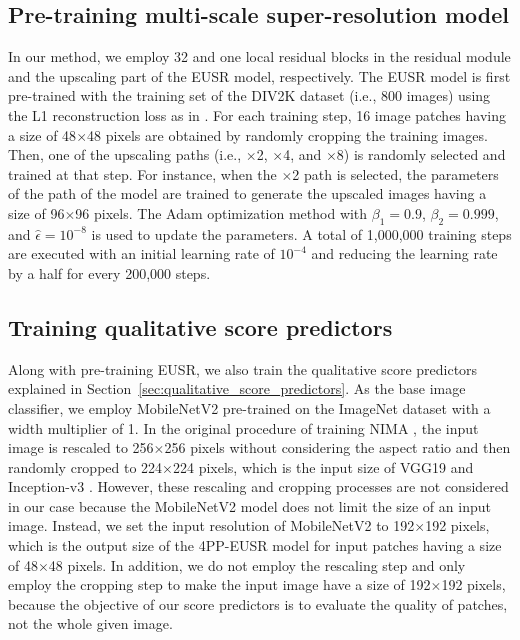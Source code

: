 \documentclass[runningheads]{llncs}
\begin{document}
\subsection{Pre-training multi-scale super-resolution model}
\label{sec:pretraining_eusr}

In our method, we employ 32 and one local residual blocks in the residual module and the upscaling part of the EUSR model, respectively.
The EUSR model is first pre-trained with the training set of the DIV2K dataset \cite{timofte2018ntire} (i.e., 800 images) using the L1 reconstruction loss as in \cite{kim2018deep}.
For each training step, 16 image patches having a size of 48$\times$48 pixels are obtained by randomly cropping the training images.
Then, one of the upscaling paths (i.e., $\times$2, $\times$4, and $\times$8) is randomly selected and trained at that step.
For instance, when the $\times$2 path is selected, the parameters of the path of the model are trained to generate the upscaled images having a size of 96$\times$96 pixels.
The Adam optimization method \cite{kingma2014adam} with $\beta_{1}=0.9$, $\beta_{2}=0.999$, and $\hat{\epsilon}={10}^{-8}$ is used to update the parameters.
A total of 1,000,000 training steps are executed with an initial learning rate of ${10}^{-4}$ and reducing the learning rate by a half for every 200,000 steps.

\subsection{Training qualitative score predictors}

Along with pre-training EUSR, we also train the qualitative score predictors explained in Section~\ref{sec:qualitative_score_predictors}.
As the base image classifier, we employ MobileNetV2 \cite{sandler2018mobilenetv2} pre-trained on the ImageNet dataset \cite{russakovsky2015imagenet} with a width multiplier of 1.
In the original procedure of training NIMA \cite{talebi2018nima}, the input image is rescaled to 256$\times$256 pixels without considering the aspect ratio and then randomly cropped to 224$\times$224 pixels, which is the input size of VGG19 \cite{simonyan2014very} and Inception-v3 \cite{szegedy2016rethinking}.
However, these rescaling and cropping processes are not considered in our case because the MobileNetV2 model does not limit the size of an input image.
Instead, we set the input resolution of MobileNetV2 to 192$\times$192 pixels, which is the output size of the 4PP-EUSR model for input patches having a size of 48$\times$48 pixels.
In addition, we do not employ the rescaling step and only employ the cropping step to make the input image have a size of 192$\times$192 pixels, because the objective of our score predictors is to evaluate the quality of patches, not the whole given image.
\end{document}
